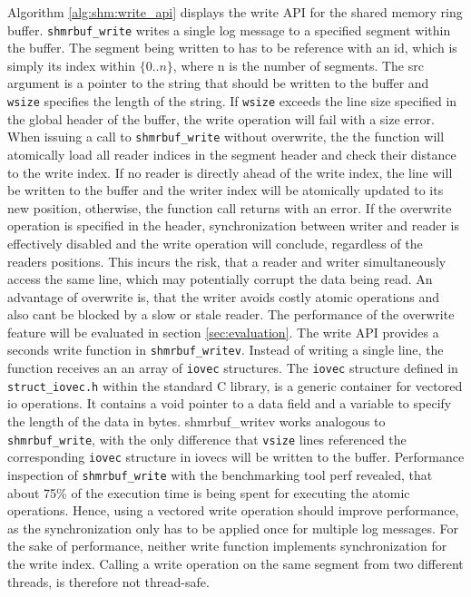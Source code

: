 Algorithm \ref{alg:shm:write_api} displays the write API for the shared memory ring buffer. \texttt{shmrbuf\_write}
writes a single log message to a specified segment within the buffer. The segment being written to has to be reference with an id, which is simply its index within $\{0..n\}$, where
n is the number of segments. The src argument is a pointer to the string that should be written to the buffer and \texttt{wsize} specifies the length of the string.
If \texttt{wsize} exceeds the line size specified in the global header of the buffer, the write operation will fail with a size error. When issuing a call to \texttt{shmrbuf\_write} without overwrite, the 
the function will atomically load all reader indices in the segment header and check their distance to the write index. If no reader is directly ahead of the write index, the line will be written
to the buffer and the writer index will be atomically updated to its new position, otherwise, the function call returns with an error. If the overwrite operation is specified in the header, synchronization between writer and reader is
effectively disabled and the write operation will conclude, regardless of the readers positions. This incurs the risk, that a reader and writer simultaneously access 
the same line, which may potentially corrupt the data being read. An advantage of overwrite is, that the writer avoids costly atomic operations and also cant be blocked 
by a slow or stale reader. The performance of the overwrite feature will be evaluated in section \ref{sec:evaluation}.
The write API provides a seconds write function in \texttt{shmrbuf\_writev}. Instead of writing a single line, the function receives an  
an array of \texttt{iovec} structures. The \texttt{iovec} structure defined in \texttt{struct\_iovec.h} within the standard C library, is a generic container for vectored
io operations. It contains a void pointer to a data field and a variable to specify the length of the data in bytes. 
shmrbuf\_writev works analogous to \texttt{shmrbuf\_write}, with the only difference that \texttt{vsize} lines referenced the corresponding \texttt{iovec}
structure in iovecs will be written to the buffer. Performance inspection of \texttt{shmrbuf\_write} with the benchmarking tool
perf \cite{perf} revealed, that about 75\% of the execution time is being spent for executing the atomic operations. Hence, 
using a vectored write operation should improve performance, as the synchronization only has to be applied once for multiple log messages.
For the sake of performance, neither write function implements synchronization for the write index. Calling a write operation
on the same segment from two different threads, is therefore not thread-safe.

